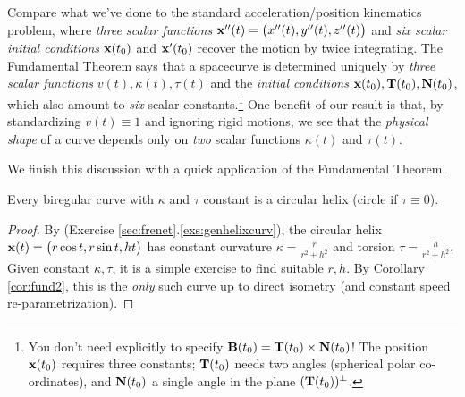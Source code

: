 
Compare what we've done to the standard acceleration/position kinematics problem, where \emph{three scalar functions} ${\mathbf{x}}''(t)=\bigl(x''(t),y''(t),z''(t)\bigr)$ and \emph{six scalar initial conditions} ${\mathbf{x}}(t_0)$ and ${\mathbf{x}}'(t_0)$ recover the motion by twice integrating.\smallbreak
The Fundamental Theorem says that a spacecurve is determined uniquely by \emph{three scalar functions} $v(t),\kappa(t),\tau(t)$ and the \emph{initial conditions} ${\mathbf{x}}(t_0),{\mathbf{T}}(t_0),{\mathbf{N}}(t_0)$, which also amount to \emph{six} scalar constants.\footnote{You don't need explicitly to specify ${\mathbf{B}}(t_0)={\mathbf{T}}(t_0)\times{\mathbf{N}}(t_0)$! The position ${\mathbf{x}}(t_0)$ requires three constants; ${\mathbf{T}}(t_0)$ needs two angles (spherical polar co-ordinates), and ${\mathbf{N}}(t_0)$ a single angle in the plane $({\mathbf{T}}(t_0))^\perp$.}\smallbreak
One benefit of our result is that, by standardizing $v(t)\equiv 1$ and ignoring rigid motions, we see that the \emph{physical shape} of a curve depends only on \emph{two} scalar functions $\kappa(t)$ and $\tau(t)$.\bigbreak


\goodbreak

We finish this discussion with a quick application of the Fundamental Theorem.

\begin{cor}{}{}
	Every biregular curve with $\kappa$ and $\tau$ constant is a circular helix (circle if $\tau\equiv 0$).
\end{cor}

\begin{proof}
	By (Exercise \ref*{sec:frenet}.\ref{exs:genhelixcurv}), the circular helix ${\mathbf{x}}(t)=\bigl(r\cos t,r\sin t,ht\bigr)$ has constant curvature $\kappa=\frac r{r^2+h^2}$ and torsion $\tau=\frac h{r^2+h^2}$.\smallbreak
	Given constant $\kappa,\tau$, it is a simple exercise to find suitable $r,h$. By Corollary \ref{cor:fund2}, this is the \emph{only} such curve up to direct isometry (and constant speed re-parametrization).
\end{proof}



